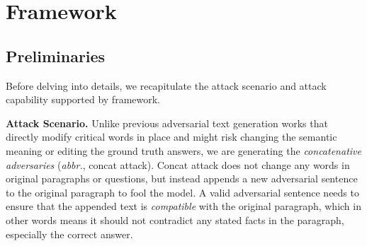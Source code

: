 
\section{Framework}


\subsection{Preliminaries}

Before delving into details, we recapitulate the attack scenario and attack capability supported by \advcodec framework. 

\textbf{Attack Scenario.} Unlike  previous adversarial text generation works \citep{2018arXiv181200151L, seq2sick,2016arXiv160408275P,2016arXiv160507725M,Alzantot2018GeneratingNL} that directly modify critical words in place and might risk changing the semantic meaning or editing the ground truth answers,
we are generating the \textit{concatenative adversaries} \citep{jia-liang-2017-adversarial} (\textit{abbr.}, concat attack). Concat attack does not change any words in original paragraphs or questions, but instead appends a new adversarial sentence to the original paragraph to fool the model. A valid adversarial sentence needs to ensure that the appended text is \textit{compatible} with the original paragraph, which in other words means it should not contradict any stated facts in the paragraph, especially the correct answer. 

